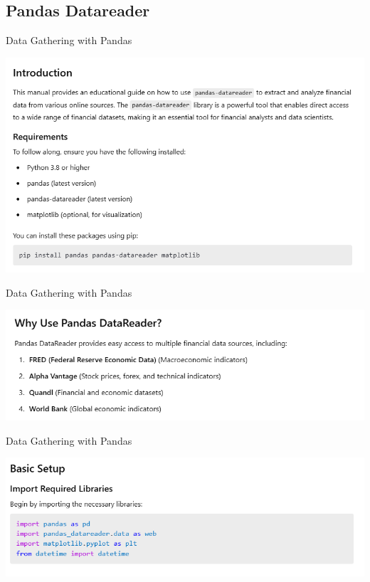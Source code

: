 \documentclass[11pt]{beamer}
\begin{document}
\subsection{Pandas Datareader \\ \scalebox{0.8}{}}
\begin{frame}{Data Gathering with Pandas}
	\begin{center}
	\includegraphics[scale=0.55]{../05-pictures/lesson-1-3_pic_0.png}
	\end{center}
\end{frame}
\begin{frame}{Data Gathering with Pandas}
	\begin{center}
	\includegraphics[scale=0.55]{../05-pictures/lesson-1-3_pic_1.png}
	\end{center}
\end{frame}
\begin{frame}{Data Gathering with Pandas}
	\begin{center}
	\includegraphics[scale=0.55]{../05-pictures/lesson-1-3_pic_2.png}
	\end{center}
\end{frame}
\end{document}
